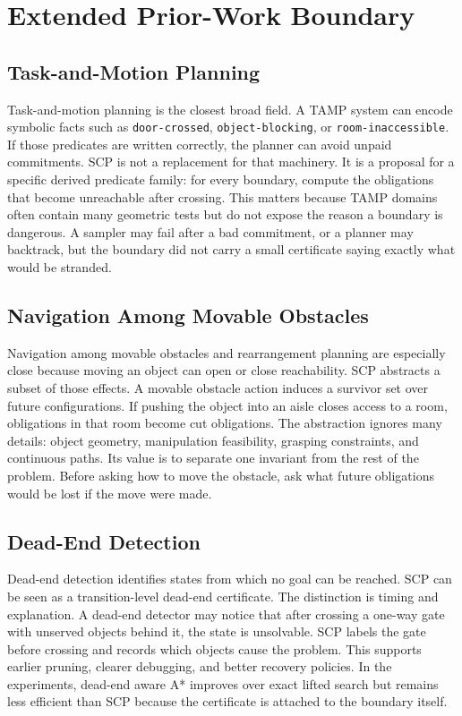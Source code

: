 \documentclass{article}
\begin{document}
\section{Extended Prior-Work Boundary}

\subsection{Task-and-Motion Planning}

Task-and-motion planning is the closest broad field. A TAMP system can encode symbolic facts such as \texttt{door-crossed}, \texttt{object-blocking}, or \texttt{room-inaccessible}. If those predicates are written correctly, the planner can avoid unpaid commitments. SCP is not a replacement for that machinery. It is a proposal for a specific derived predicate family: for every boundary, compute the obligations that become unreachable after crossing. This matters because TAMP domains often contain many geometric tests but do not expose the reason a boundary is dangerous. A sampler may fail after a bad commitment, or a planner may backtrack, but the boundary did not carry a small certificate saying exactly what would be stranded.

\subsection{Navigation Among Movable Obstacles}

Navigation among movable obstacles and rearrangement planning are especially close because moving an object can open or close reachability. SCP abstracts a subset of those effects. A movable obstacle action induces a survivor set over future configurations. If pushing the object into an aisle closes access to a room, obligations in that room become cut obligations. The abstraction ignores many details: object geometry, manipulation feasibility, grasping constraints, and continuous paths. Its value is to separate one invariant from the rest of the problem. Before asking how to move the obstacle, ask what future obligations would be lost if the move were made.

\subsection{Dead-End Detection}

Dead-end detection identifies states from which no goal can be reached. SCP can be seen as a transition-level dead-end certificate. The distinction is timing and explanation. A dead-end detector may notice that after crossing a one-way gate with unserved objects behind it, the state is unsolvable. SCP labels the gate before crossing and records which objects cause the problem. This supports earlier pruning, clearer debugging, and better recovery policies. In the experiments, dead-end aware A* improves over exact lifted search but remains less efficient than SCP because the certificate is attached to the boundary itself.
\end{document}
